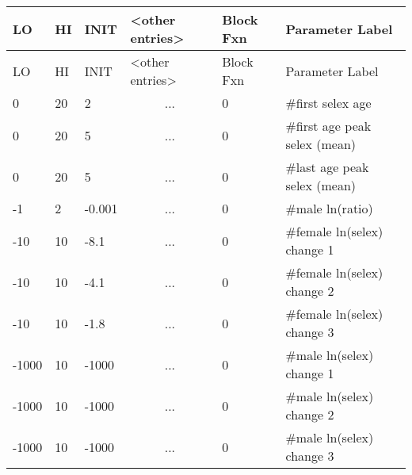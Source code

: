 	\begin{longtable}{p{1cm} p{1cm} p{1cm} p{2.9cm} p{1.8cm} p{5.1cm}}
		\hline
		LO \Tstrut & HI & INIT & <other entries> & Block Fxn & Parameter Label \Bstrut\\
		\hline
		\endfirsthead
		
		\hline
		LO \Tstrut & HI & INIT & <other entries> & Block Fxn & Parameter Label \Bstrut\\
		\hline
		\endhead

		0     & 20 &  2     &  \multicolumn{1}{c}{...} & 0 & \#first selex age \Tstrut\\
		0     & 20 &  5     &  \multicolumn{1}{c}{...} & 0 & \#first age peak selex (mean) \\
		0     & 20 &  5     &  \multicolumn{1}{c}{...} & 0 & \#last age peak selex (mean) \\
		-1    &  2 & -0.001 &  \multicolumn{1}{c}{...} & 0 & \#male ln(ratio) \\
		-10   & 10 & -8.1   &  \multicolumn{1}{c}{...} & 0 & \#female ln(selex) change 1 \\
		-10   & 10 & -4.1   &  \multicolumn{1}{c}{...} & 0 & \#female ln(selex) change 2 \\
		-10   & 10 & -1.8   &  \multicolumn{1}{c}{...} & 0 & \#female ln(selex) change 3 \\
		-1000 & 10 & -1000  &  \multicolumn{1}{c}{...} & 0 & \#male ln(selex) change 1 \\
		-1000 & 10 & -1000  &  \multicolumn{1}{c}{...} & 0 & \#male ln(selex) change 2 \\
		-1000 & 10 & -1000  &  \multicolumn{1}{c}{...} & 0 & \#male ln(selex) change 3 \Bstrut\\
		\hline
	\end{longtable}

\hypertarget{Retention}{}
